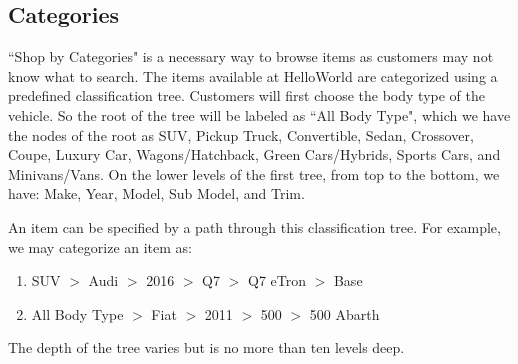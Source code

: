 \documentclass[12pt]{article}
\begin{document}
\subsection{Categories}``Shop by Categories" is a necessary way to browse items as customers may not know what to search. The items available at HelloWorld are categorized using a predefined classification tree. Customers will first choose the body type of the vehicle. So the root of the tree will be labeled as ``All Body Type", which we have the nodes of the root as SUV, Pickup Truck, Convertible, Sedan, Crossover, Coupe, Luxury Car, Wagons/Hatchback, Green Cars/Hybrids, Sports Cars, and Minivans/Vans. On the lower levels of the first tree, from top to the bottom, we have: Make, Year, Model, Sub Model, and Trim. \par
An item can be specified by a path through this classification tree. For example, we may
categorize an item as:
\begin{enumerate}
\item SUV $>$ Audi $>$ 2016 $>$ Q7 $>$ Q7 eTron $>$ Base\par
\item All Body Type $>$ Fiat $>$ 2011 $>$ 500 $>$ 500 Abarth\par
\end{enumerate}
\par The depth of the tree varies but is no more than ten levels deep.
\end{document}
